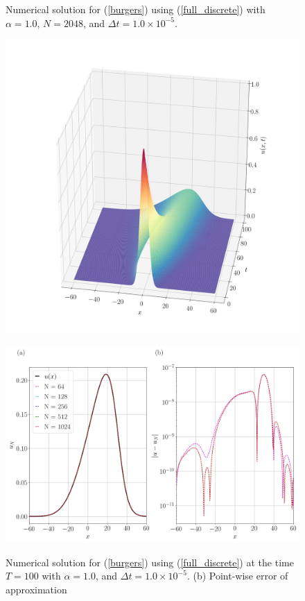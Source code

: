 	\newpage	
	\begin{figure}[H]
		\centering
		\caption{Numerical solution for (\ref{burgers}) using (\ref{full_discrete}) with $\alpha = 1.0$, $N=2048$, and $\Delta t = 1.0 \times 10^{-5}$.}
		\includegraphics[width=12cm]{Figures/Galerkin/Graphics/eps=1.0/Numerical_Solution_alpha=1.png}
		\label{Galerkin_alpha=1}
		\caption{Numerical solution for (\ref{burgers}) using (\ref{full_discrete}) at the time $T = 100$ with $\alpha = 1.0$, and $\Delta t = 1.0 \times 10^{-5}$. (b) Point-wise error of approximation}
		\includegraphics[width=12.5cm]{Figures/Galerkin/Graphics/eps=1.0/Numerical_Solution_alpha=1_T=100.png}
		\label{Galerkin_alpha=1_T}
	\end{figure}
